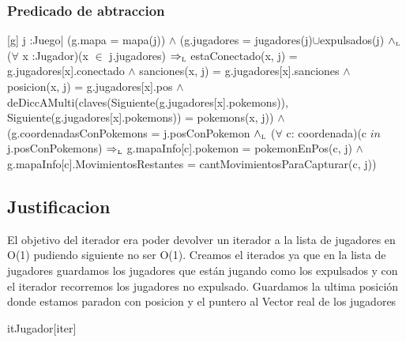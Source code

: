\begin{Representacion}


\subsubsection{Predicado de abtraccion}

[g]{ j :Juego| (g.mapa = mapa(j)) $\wedge$ (g.jugadores = jugadores(j)$\cup$expulsados(j) $\land_{\mathrm{\scriptscriptstyle{L}}}$ ($\forall$ x :Jugador)(x $\in$ j.jugadores) $\Rightarrow_{\mathrm{\scriptscriptstyle{L}}}$ estaConectado(x, j) = g.jugadores[x].conectado $\wedge$ sanciones(x, j) = g.jugadores[x].sanciones $\wedge$ posicion(x, j) = g.jugadores[x].pos $\wedge$ deDiccAMulti(claves(Siguiente(g.jugadores[x].pokemons)), Siguiente(g.jugadores[x].pokemons)) = pokemons(x, j)) $\wedge$ (g.coordenadasConPokemons = j.posConPokemon $\land_{\mathrm{\scriptscriptstyle{L}}}$ ($\forall$ c: coordenada)(c $in$ j.posConPokemons) $\Rightarrow_{\mathrm{\scriptscriptstyle{L}}}$ g.mapaInfo[c].pokemon = pokemonEnPos(c, j) $\wedge$ g.mapaInfo[c].MovimientosRestantes = cantMovimientosParaCapturar(c, j))}






\subsection{Justificacion}
	El objetivo del iterador era poder devolver un iterador a la lista de jugadores en O(1) pudiendo siguiente no ser O(1). Creamos el iterados ya que en la lista de jugadores guardamos los jugadores que est\'an jugando como los expulsados y con el iterador recorremos los jugadores no expulsado. Guardamos la ultima posici\'on donde estamos paradon con posicion y el puntero al Vector real de los jugadores
	
	\begin{Estructura}{itJugador}[iter]
		\begin{Tupla}[iter]
		\end{Tupla}
	\end{Estructura}

\end{Representacion}
